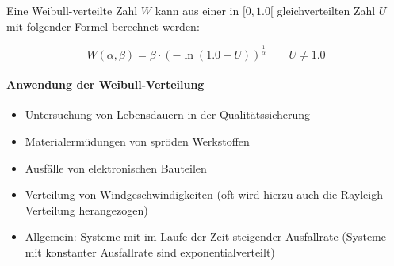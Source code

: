 Eine Weibull-verteilte Zahl $W$ kann aus einer in $[0, 1.0[$ gleichverteilten Zahl $U$ mit folgender Formel berechnet werden:

\begin{equation}
	W(\alpha,\beta) = \beta \cdot (-\ln(1.0-U))^\frac{1}{\alpha}  \qquad U \neq 1.0
\end{equation}

\paragraph{Anwendung der Weibull-Verteilung}
\begin{itemize}
	\item Untersuchung von Lebensdauern in der Qualitätssicherung
	\item Materialermüdungen von spröden Werkstoffen
	\item Ausfälle von elektronischen Bauteilen
	\item Verteilung von Windgeschwindigkeiten (oft wird hierzu auch die Rayleigh-Verteilung herangezogen)
	\item Allgemein: Systeme mit im Laufe der Zeit steigender Ausfallrate (Systeme mit konstanter Ausfallrate sind exponentialverteilt)
\end{itemize}
